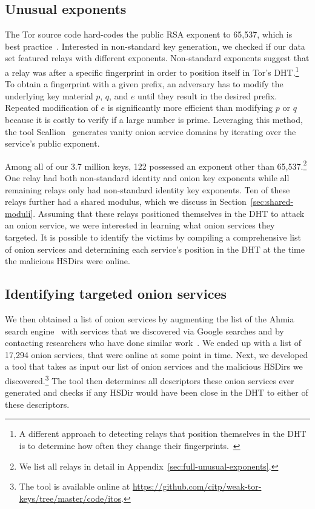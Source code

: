 \subsection{Unusual exponents}
\label{sec:unusual-exponents}
The Tor source code hard-codes the public RSA exponent to 65,537, which is best
practice~\cite[\S~4]{Boneh1999a}.  Interested in non-standard key
generation, we checked if our data set featured relays with different
exponents.  Non-standard exponents suggest that a relay was after a specific
fingerprint in order to position itself in Tor's DHT.\footnote{A different
approach to detecting relays that position themselves in the DHT is to
determine how often they change their
fingerprints.~\cite[\S~4.3.3]{Winter2016a}} To obtain a fingerprint with a given
prefix, an adversary has to modify the underlying key material $p$, $q$, and $e$
until they result in the desired prefix.  Repeated modification of $e$ is
significantly more efficient than modifying $p$ or $q$ because it is costly to
verify if a large number is prime.  Leveraging this method, the tool
Scallion~\cite{scallion} generates vanity onion service domains by iterating
over the service's public exponent.

Among all of our 3.7 million keys, 122 possessed an exponent other than
65,537.\footnote{We list all relays in detail in
Appendix~\ref{sec:full-unusual-exponents}.} One relay had both non-standard
identity and onion key exponents while all remaining relays only had
non-standard identity key exponents.  Ten of these relays further had a shared
modulus, which we discuss in Section~\ref{sec:shared-moduli}.  Assuming that
these relays positioned themselves in the DHT to attack an onion service,
we were interested in learning what onion services they targeted.  It is
possible to identify the victims by compiling a comprehensive list of onion
services and determining each service's position in the DHT at the time
the malicious HSDirs were online.

\subsection{Identifying targeted onion services}
\label{sec:targeted-onion-services}

We then obtained a list of onion services by augmenting the list of the Ahmia
search engine~\cite{ahmia} with services that we discovered via Google searches
and by contacting researchers who have done similar work~\cite{Matic2015a}.  We
ended up with a list of 17,294 onion services, that were online at some point in
time.  Next, we developed a tool that takes as input our list of onion services
and the malicious HSDirs we discovered.\footnote{The tool is available online at
\url{https://github.com/citp/weak-tor-keys/tree/master/code/itos}.}  The tool
then determines all descriptors these onion services ever generated and checks
if any HSDir would have been close in the DHT to either of these
descriptors.

